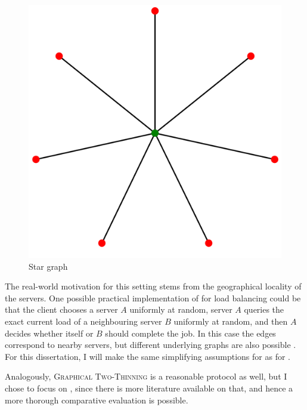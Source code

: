 \begin{figure}[hbt!] \label{star-graph}
    \centering
    \includegraphics[scale=0.1]{Chapter2/Figs/star_graph.png}
    \caption{Star graph \cite{stargraph}}
\end{figure}


The real-world motivation for this setting stems from the geographical locality of the servers. One possible practical implementation of \GraphicalTwoChoice for load balancing could be that the client chooses a server $A$ uniformly at random, server $A$ queries the exact current load of a neighbouring server $B$ uniformly at random, and then $A$ decides whether itself or $B$ should complete the job. In this case the edges correspond to nearby servers, but different underlying graphs are also possible \cite{peres2015oneplusbeta}. For this dissertation, I will make the same simplifying assumptions for \GraphicalTwoChoice as for \TwoThinning. 


Analogously, \textsc{Graphical Two-Thinning} is a reasonable protocol as well, but I chose to focus on \GraphicalTwoChoice, since there is more literature available on that, and hence a more thorough comparative evaluation is possible.\\


